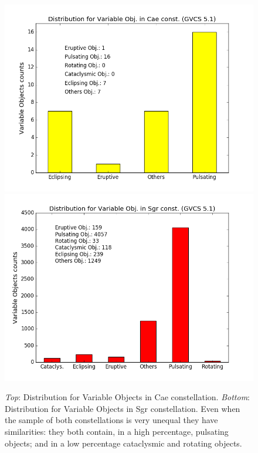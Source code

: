 \begin{enumerate} [a)]
\begin{figure}[tb]
\centering
\includegraphics[width=\linewidth, clip]{Cae_variable_dist.png}
\includegraphics[width=\linewidth, clip]{Sgr_variable_dist.png}
\caption{\textit{Top}: Distribution for Variable Objects in Cae constellation.
\textit{Bottom}: Distribution for Variable Objects in Sgr constellation.
Even when the sample of both constellations is very unequal they have similarities: they both contain, in a high percentage, pulsating objects; and in a low percentage cataclysmic and rotating objects.}
\label{fig:F1}
\end{figure}


\end{enumerate}
